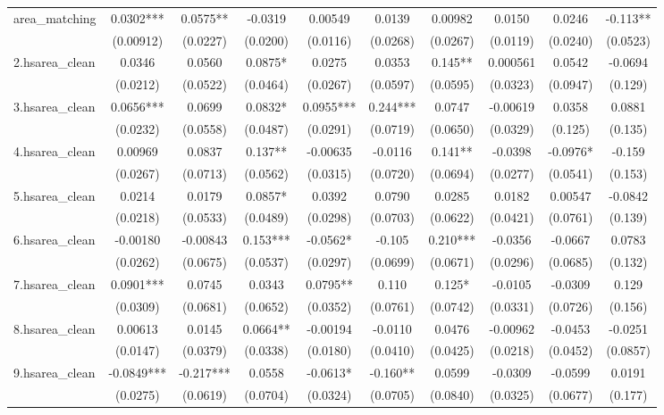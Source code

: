\documentclass[]{article}
\begin{document}
\begin{tabular}{lccccccccc}
area\_matching & 0.0302*** & 0.0575** & -0.0319 & 0.00549 & 0.0139 & 0.00982 & 0.0150 & 0.0246 & -0.113** \\
 & (0.00912) & (0.0227) & (0.0200) & (0.0116) & (0.0268) & (0.0267) & (0.0119) & (0.0240) & (0.0523) \\
2.hsarea\_clean & 0.0346 & 0.0560 & 0.0875* & 0.0275 & 0.0353 & 0.145** & 0.000561 & 0.0542 & -0.0694 \\
 & (0.0212) & (0.0522) & (0.0464) & (0.0267) & (0.0597) & (0.0595) & (0.0323) & (0.0947) & (0.129) \\
3.hsarea\_clean & 0.0656*** & 0.0699 & 0.0832* & 0.0955*** & 0.244*** & 0.0747 & -0.00619 & 0.0358 & 0.0881 \\
 & (0.0232) & (0.0558) & (0.0487) & (0.0291) & (0.0719) & (0.0650) & (0.0329) & (0.125) & (0.135) \\
4.hsarea\_clean & 0.00969 & 0.0837 & 0.137** & -0.00635 & -0.0116 & 0.141** & -0.0398 & -0.0976* & -0.159 \\
 & (0.0267) & (0.0713) & (0.0562) & (0.0315) & (0.0720) & (0.0694) & (0.0277) & (0.0541) & (0.153) \\
5.hsarea\_clean & 0.0214 & 0.0179 & 0.0857* & 0.0392 & 0.0790 & 0.0285 & 0.0182 & 0.00547 & -0.0842 \\
 & (0.0218) & (0.0533) & (0.0489) & (0.0298) & (0.0703) & (0.0622) & (0.0421) & (0.0761) & (0.139) \\
6.hsarea\_clean & -0.00180 & -0.00843 & 0.153*** & -0.0562* & -0.105 & 0.210*** & -0.0356 & -0.0667 & 0.0783 \\
 & (0.0262) & (0.0675) & (0.0537) & (0.0297) & (0.0699) & (0.0671) & (0.0296) & (0.0685) & (0.132) \\
7.hsarea\_clean & 0.0901*** & 0.0745 & 0.0343 & 0.0795** & 0.110 & 0.125* & -0.0105 & -0.0309 & 0.129 \\
 & (0.0309) & (0.0681) & (0.0652) & (0.0352) & (0.0761) & (0.0742) & (0.0331) & (0.0726) & (0.156) \\
8.hsarea\_clean & 0.00613 & 0.0145 & 0.0664** & -0.00194 & -0.0110 & 0.0476 & -0.00962 & -0.0453 & -0.0251 \\
 & (0.0147) & (0.0379) & (0.0338) & (0.0180) & (0.0410) & (0.0425) & (0.0218) & (0.0452) & (0.0857) \\
9.hsarea\_clean & -0.0849*** & -0.217*** & 0.0558 & -0.0613* & -0.160** & 0.0599 & -0.0309 & -0.0599 & 0.0191 \\
 & (0.0275) & (0.0619) & (0.0704) & (0.0324) & (0.0705) & (0.0840) & (0.0325) & (0.0677) & (0.177) \\

\end{tabular}
\end{document}
